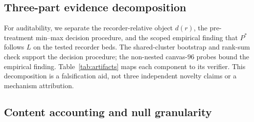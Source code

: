 \documentclass{article}
\begin{document}
\subsection{Three-part evidence decomposition}\label{sec:novelty}

For auditability, we separate the recorder-relative object $d(r)$, the
pre-treatment min--max decision procedure, and the scoped empirical finding that
$P^*$ follows $L$ on the tested recorder beds. The shared-cluster bootstrap and
rank-sum check support the decision procedure; the non-nested canvas-$96$ probes
bound the empirical finding. Table~\ref{tab:artifacts} maps each component to
its verifier. This decomposition is a falsification aid, not three independent
novelty claims or a mechanism attribution.

\subsection{Content accounting and null granularity}
\end{document}

